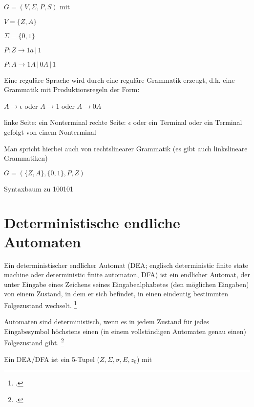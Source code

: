 \documentclass{lehramt-informatik-haupt}
\begin{document}
$G = (V, \Sigma, P, S)$ mit

$V = \{Z, A\}$

$\Sigma = \{0, 1\}$

$P: Z \rightarrow 1a \,|\, 1$

$P: A \rightarrow 1A \,|\, 0A \,|\, 1$

Eine reguläre Sprache wird durch eine reguläre
Grammatik erzeugt, d.h. eine Grammatik mit
Produktionsregeln der Form:

$A \rightarrow \epsilon$ oder $A \rightarrow 1$ oder $A \rightarrow 0A$

linke Seite: ein Nonterminal rechte Seite: $\epsilon$ oder ein Terminal
oder ein Terminal gefolgt von einem Nonterminal

Man spricht hierbei auch von rechtslinearer Grammatik (es gibt auch
linkslineare Grammatiken)

$G = (\{Z, A\}, \{0, 1\}, P, Z)$

Syntaxbaum zu 100101
\begin{center}
\end{center}

%

\section{Deterministische endliche Automaten}

Ein deterministischer endlicher Automat (DEA; englisch deterministic
finite state machine oder deterministic finite automaton, DFA) ist ein
endlicher Automat, der unter Eingabe eines Zeichens seines
Eingabealphabetes (den möglichen Eingaben) von einem Zustand, in dem er
sich befindet, in einen eindeutig bestimmten Folgezustand wechselt.
\footcite{wiki:dea}

Automaten sind deterministisch, wenn es in jedem Zustand für jedes
Eingabesymbol höchstens einen (in einem vollständigen Automaten genau
einen) Folgezustand gibt.
\footcite[Seite 28]{vossen}

Ein DEA/DFA ist ein 5-Tupel ($Z, \Sigma, \sigma, E, z_0$) mit
\end{document}
